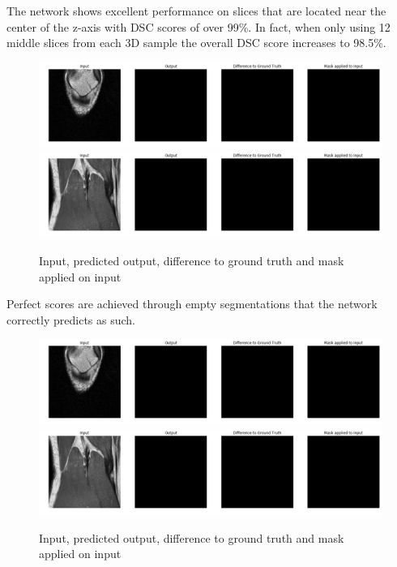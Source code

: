 The network shows excellent performance on slices that are located near the center of the z-axis with DSC scores of over 99\%. In fact, when only using 12 middle slices from each 3D sample the overall DSC score increases to 98.5\%.

\begin{figure}[H]
\centering
\par
\includegraphics[width=1.0\textwidth]{imgs/sample5.png}
\includegraphics[width=1.0\textwidth]{imgs/sample6.png}
\caption{Input, predicted output, difference to ground truth and mask applied on input}
\par
\end{figure}

Perfect scores are achieved through empty segmentations that the network correctly predicts as such.

\begin{figure}[H]
\centering
\par
\includegraphics[width=1.0\textwidth]{imgs/sample5.png}
\includegraphics[width=1.0\textwidth]{imgs/sample6.png}
\caption{Input, predicted output, difference to ground truth and mask applied on input}
\par
\end{figure}

